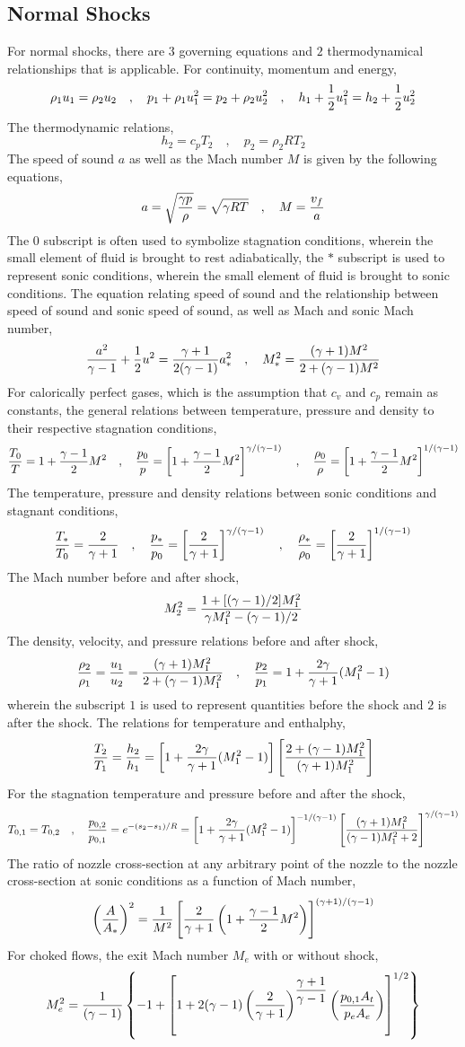 \documentclass[a4paper, 12pt]{report}
\begin{document}
\begin{center}
\subsection{Normal Shocks}
\begin{comment}
\end{comment}
For normal shocks, there are $3$ governing equations and $2$ thermodynamical relationships that is applicable. For continuity, momentum and energy,
$$\rho_1u_1 = \rho_2u_2 \quad,\quad p_1 + \rho_1 u_1^2 = p_2 + \rho_2 u_2^2 \quad,\quad h_1 + \frac{1}{2}u_1^2 = h_2 + \frac{1}{2}u_2^2$$
The thermodynamic relations,    
$$h_2 = c_pT_2 \quad,\quad p_2 = \rho_2 RT_2$$
The speed of sound $a$ as well as the Mach number $M$ is given by the following equations,$$a = \sqrt{\frac{\gamma p}{\rho}} = \sqrt{\gamma RT} \quad,\quad M = \frac{v_f}{a}$$
The $0$ subscript is often used to symbolize stagnation conditions, wherein the small element of fluid is brought to rest adiabatically, the $*$ subscript is used to represent sonic conditions, wherein the small element of fluid is brought to sonic conditions. The equation relating speed of sound and the relationship between speed of sound and sonic speed of sound, as well as Mach and sonic Mach number,
$$\frac{a^2}{\gamma-1} + \frac{1}{2}u^2 = \frac{\gamma+1}{2(\gamma-1)}a_*^2\quad,\quad M_*^2 = \frac{(\gamma+1)M^2}{2 + (\gamma-1)M^2}$$
For calorically perfect gases, which is the assumption that $c_v$ and $c_p$ remain as constants, the general relations between temperature, pressure and density to their respective stagnation conditions,
$$\frac{T_0}{T} = 1 + \frac{\gamma-1}{2}M^2 \quad,\quad \frac{p_0}{p} = \left[1 + \frac{\gamma-1}{2}M^2\right]^{\gamma/(\gamma-1)} \quad,\quad \frac{\rho_0}{\rho} = \left[1 + \frac{\gamma-1}{2}M^2\right]^{1/(\gamma-1)}$$
The temperature, pressure and density relations between sonic conditions and stagnant conditions,
$$\frac{T_*}{T_0} = \frac{2}{\gamma+1} \quad,\quad \frac{p_*}{p_0} = \left[\frac{2}{\gamma+1}\right]^{\gamma/(\gamma-1)} \quad,\quad \frac{\rho_*}{\rho_0} = \left[\frac{2}{\gamma+1}\right]^{1/(\gamma-1)}$$
The Mach number before and after shock,
$$M_2^2 = \frac{1+[(\gamma-1)/2]M_1^2}{\gamma M_1^2-(\gamma-1)/2}$$
The density, velocity, and pressure relations before and after shock,
$$\frac{\rho_2}{\rho_1} = \frac{u_1}{u_2} = \frac{(\gamma+1)M_1^2}{2+(\gamma-1)M_1^2} \quad,\quad \frac{p_2}{p_1} = 1 + \frac{2\gamma}{\gamma+1}(M_1^2 - 1)$$
wherein the subscript $1$ is used to represent quantities before the shock and $2$ is after the shock. The relations for temperature and enthalphy,
$$\frac{T_2}{T_1} = \frac{h_2}{h_1} = \left[1 + \frac{2\gamma}{\gamma+1}(M_1^2 - 1)\right]\left[\frac{2+(\gamma-1)M_1^2}{(\gamma+1)M_1^2}\right]$$
For the stagnation temperature and pressure before and after the shock,
$$T_{0,1} = T_{0,2} \quad,\quad \frac{p_{0,2}}{p_{0,1}} = e^{-(s_2-s_1)/R} = \left[1+\frac{2\gamma}{\gamma+1}(M_1^2-1)\right]^{-1/(\gamma-1)}\left[\frac{(\gamma+1)M_1^2}{(\gamma-1)M_1^2+2}\right]^{\gamma/(\gamma-1)}$$
The ratio of nozzle cross-section at any arbitrary point of the nozzle to the nozzle cross-section at sonic conditions as a function of Mach number,
$$\left(\frac{A}{A_*}\right)^2 = \frac{1}{M^2}\left[\frac{2}{\gamma+1}\left(1+\frac{\gamma-1}{2}M^2\right)\right]^{(\gamma+1)/(\gamma-1)}$$
For choked flows, the exit Mach number $M_e$ with or without shock,
$$M_e^2 = \frac{1}{(\gamma-1)}\left\{-1 + \left[1 + 2(\gamma-1)\left(\frac{2}{\gamma+1}\right)^{\displaystyle{\frac{\gamma+1}{\gamma-1}}}\left(\frac{p_{0,1}A_t}{p_e A_e}\right)\right]^{1/2}\right\}$$

\end{center}
\end{document}
